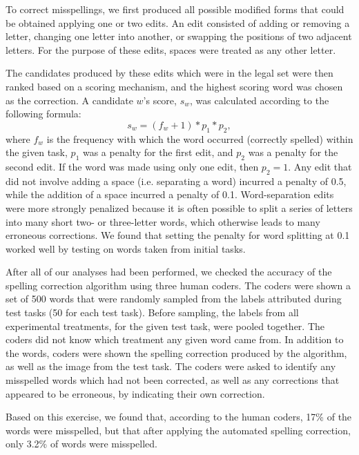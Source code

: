 \documentclass[12pt]{article}
\begin{document}
	To correct misspellings, we first produced all possible modified forms 
	that could be obtained applying one or two edits.  An edit consisted of 
	adding or removing a letter, changing one letter into another, or 
	swapping the positions of two adjacent letters.  For the purpose of these 
	edits, spaces were treated as any other letter.

	The candidates produced by these edits which were in the legal set were
	then ranked based on a scoring mechanism, and the highest scoring word
	was chosen as the correction.  A candidate $w$'s score, $s_w$, was 
	calculated according to the following formula:
	\begin{equation}
		s_w = (f_w + 1) * p_1 * p_2,
	\end{equation}
	where $f_w$ is the frequency with which the word occurred (correctly 
	spelled)
	within the given task, $p_1$ was a penalty for the first edit, and
	$p_2$ was a penalty for the second edit.  If the word was made using only
	one edit, then $p_2 = 1$.  Any edit that did not involve adding a space
	(i.e. separating a word) incurred a penalty of 0.5, while the addition of
	a space incurred a penalty of 0.1.  Word-separation edits were more 
	strongly penalized because it is often possible to split a series of 
	letters into many short two- or three-letter words, which otherwise leads 
	to many erroneous corrections.  We found that setting the penalty for
	word splitting at 0.1 worked well by testing on words taken from
	initial tasks.

	After all of our analyses had been performed, we checked the accuracy of 
	the spelling correction algorithm using three human coders.  The coders
	were shown a set of 
	500 words that were randomly sampled from the labels attributed during 
	test tasks (50 for each test task).  Before sampling, the labels from all
	experimental treatments, for the given test task, were pooled together.
	The coders did not know which treatment any given word came from.  
	In addition to the words, coders were shown the spelling correction 
	produced by the algorithm, as well as the image from the test task.
	The coders were asked to identify any misspelled words which had not 
	been corrected, as well as any corrections that appeared to be erroneous,
	by indicating their own correction.

	Based on this exercise, we found that, according to the human coders,
	17\% of the words were misspelled, but that after applying the 
	automated spelling correction, only 3.2\% of words were misspelled.
\end{document}
